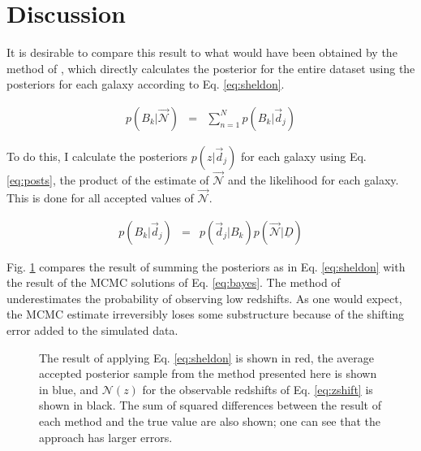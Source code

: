 \documentclass[12pt, onecolumn]{emulateapj}
\newcommand{\textul}{\underline}
\begin{document}
\section{Discussion}

It is desirable to compare this result to what would have been obtained by the method of \citet{she11}, which directly calculates the posterior for the entire dataset using the posteriors for each galaxy according to Eq. \ref{eq:sheldon}.

\begin{eqnarray}
\label{eq:sheldon}
p(B_{k}|\vec{\mathcal{N}}) &=& \sum_{n=1}^{N}p(B_{k}|\vec{d}_{j})
\end{eqnarray}

To do this, I calculate the posteriors $p(z|\vec{d}_{j})$ for each galaxy using Eq. \ref{eq:posts}, the product of the estimate of $\vec{\mathcal{N}}$ and the likelihood for each galaxy.  This is done for all accepted values of $\vec{\mathcal{N}}$.

\begin{eqnarray}
\label{eq:posts}
p(B_{k}|\vec{d}_{j}) &=& p(\vec{d}_{j}|B_{k})p(\vec{\mathcal{N}}|\textul{D})
\end{eqnarray}

Fig. \ref{fig:sheldon} compares the result of summing the posteriors as in Eq. \ref{eq:sheldon} with the result of the MCMC solutions of Eq. \ref{eq:bayes}.  The method of \citet{she11} underestimates the probability of observing low redshifts.  As one would expect, the MCMC estimate irreversibly loses some substructure because of the shifting error added to the simulated data.

\begin{figure}
\label{fig:sheldon}
\caption{The result of applying Eq. \ref{eq:sheldon} is shown in red, the average accepted posterior sample from the method presented here is shown in blue, and $\mathcal{N}(z)$ for the observable redshifts of Eq. \ref{eq:zshift} is shown in black.  The sum of squared differences between the result of each method and the true value are also shown; one can see that the \citet{she11} approach has larger errors.}
\end{figure}


\end{document}
